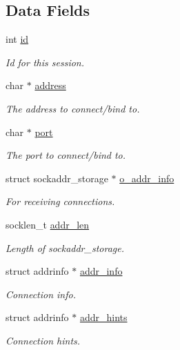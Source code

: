 \subsection*{Data Fields}
\begin{DoxyCompactItemize}
\item 
int \hyperlink{structtb__session__t_a7441ef0865bcb3db9b8064dd7375c1ea}{id}
\begin{DoxyCompactList}\small\item\em Id for this session. \end{DoxyCompactList}\item 
char $\ast$ \hyperlink{structtb__session__t_a879a8cdf605d02f8af8b2e216b8764f2}{address}
\begin{DoxyCompactList}\small\item\em The address to connect/bind to. \end{DoxyCompactList}\item 
char $\ast$ \hyperlink{structtb__session__t_add99ba4ea70b8f66170823cad9a55fa4}{port}
\begin{DoxyCompactList}\small\item\em The port to connect/bind to. \end{DoxyCompactList}\item 
struct sockaddr\-\_\-storage $\ast$ \hyperlink{structtb__session__t_a723d705438178675e55878826ac4ae7c}{o\-\_\-addr\-\_\-info}
\begin{DoxyCompactList}\small\item\em For receiving connections. \end{DoxyCompactList}\item 
socklen\-\_\-t \hyperlink{structtb__session__t_a116941d922ae354d7241d04b0f3c84d8}{addr\-\_\-len}
\begin{DoxyCompactList}\small\item\em Length of sockaddr\-\_\-storage. \end{DoxyCompactList}\item 
struct addrinfo $\ast$ \hyperlink{structtb__session__t_aab742bc33815bd69bf49ad1861006b97}{addr\-\_\-info}
\begin{DoxyCompactList}\small\item\em Connection info. \end{DoxyCompactList}\item 
struct addrinfo $\ast$ \hyperlink{structtb__session__t_a105521cb94384edeaace1a1ce7b3d7c7}{addr\-\_\-hints}
\begin{DoxyCompactList}\small\item\em Connection hints. \end{DoxyCompactList}\item 

\end{DoxyCompactItemize}
